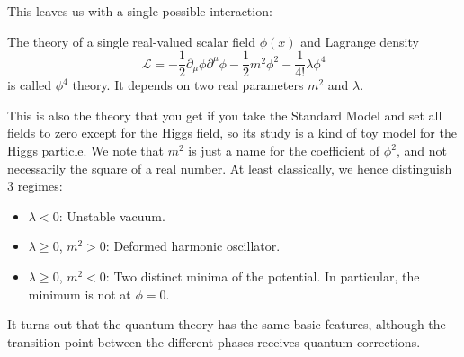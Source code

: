 \documentclass[12pt]{article}
\begin{document}
This leaves us with a single possible interaction:
\begin{definition}
  The theory of a single real-valued scalar field $\phi(x)$ and
  Lagrange density
  \begin{equation}
    \mathcal{L} = 
    -\frac{1}{2} \partial_\mu \phi \partial^\mu \phi
    -\frac{1}{2} m^2 \phi^2 
    -\frac{1}{4!} \lambda \phi^4
  \end{equation}
  is called $\phi^4$ theory. It depends on two real parameters $m^2$
  and $\lambda$.
\end{definition}
This is also the theory that you get if you take the Standard Model
and set all fields to zero except for the Higgs field, so its study is
a kind of toy model for the Higgs particle. We note that $m^2$ is just
a name for the coefficient of $\phi^2$, and not necessarily the square
of a real number. At least classically, we hence distinguish $3$
regimes:
\begin{itemize}
\item $\lambda < 0$: Unstable vacuum.
\item $\lambda \geq 0$, $m^2 > 0$: Deformed harmonic oscillator.
\item $\lambda \geq 0$, $m^2 < 0$: Two distinct minima of the
  potential. In particular, the minimum is not at $\phi=0$.
\end{itemize}
It turns out that the quantum theory has the same basic features,
although the transition point between the different phases receives
quantum corrections.
\end{document}
